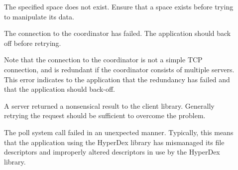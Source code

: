 \begin{description}
\item[] The specified space does not exist.
    Ensure that a space exists before trying to manipulate its data.
\item[] The connection to the coordinator has
    failed.  The application should back off before retrying.

    Note that the connection to the coordinator is not a simple TCP connection,
    and is redundant if the coordinator consists of multiple servers.  This
    error indicates to the application that the redundancy has failed and that
    the application should back-off.
\item[] A server returned a nonsensical
    result to the client library.  Generally retrying the request should be
    sufficient to overcome the problem.
\item[] The poll system call failed in an
    unexpected manner.  Typically, this means that the application using the
    HyperDex library has mismanaged its file descriptors and improperly altered
    descriptors in use by the HyperDex library.


\end{description}
